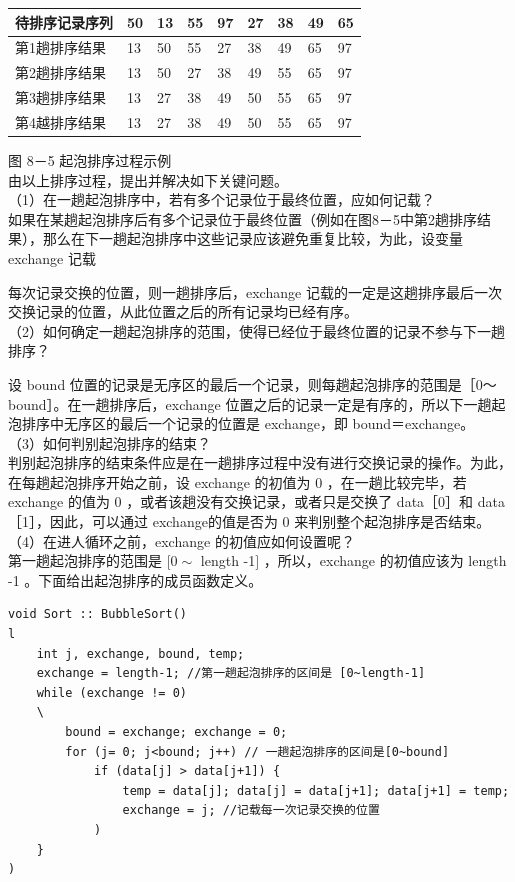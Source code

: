 \documentclass[10pt]{article}
\begin{document}
\begin{center}
\begin{tabular}{|l|l|l|l|l|l|l|l|l|}
\hline
待排序记录序列 & 50 & 13 & 55 & 97 & 27 & 38 & 49 & 65 \\
\hline
第1趟排序结果 & 13 & 50 & 55 & 27 & 38 & 49 & 65 & 97 \\
\hline
第2趟排序结果 & 13 & 50 & 27 & 38 & 49 & 55 & 65 & 97 \\
\hline
第3趟排序结果 & 13 & 27 & 38 & 49 & 50 & 55 & 65 & 97 \\
\hline
第4越排序结果 & 13 & 27 & 38 & 49 & 50 & 55 & 65 & 97 \\
\hline
\end{tabular}
\end{center}

图 8－5 起泡排序过程示例\\
由以上排序过程，提出并解决如下关键问题。\\
（1）在一趟起泡排序中，若有多个记录位于最终位置，应如何记载？\\
如果在某趟起泡排序后有多个记录位于最终位置（例如在图8－5中第2趟排序结果），那么在下一趟起泡排序中这些记录应该避免重复比较，为此，设变量 exchange 记载

每次记录交换的位置，则一趟排序后，exchange 记载的一定是这趟排序最后一次交换记录的位置，从此位置之后的所有记录均已经有序。\\
（2）如何确定一趟起泡排序的范围，使得已经位于最终位置的记录不参与下一趟排序？

设 bound 位置的记录是无序区的最后一个记录，则每趟起泡排序的范围是［0～ bound］。在一趟排序后，exchange 位置之后的记录一定是有序的，所以下一趟起泡排序中无序区的最后一个记录的位置是 exchange，即 bound＝exchange。\\
（3）如何判别起泡排序的结束？\\
判别起泡排序的结束条件应是在一趟排序过程中没有进行交换记录的操作。为此，在每趟起泡排序开始之前，设 exchange 的初值为 0 ，在一趟比较完毕，若 exchange 的值为 0 ，或者该趟没有交换记录，或者只是交换了 data［0］和 data［1］，因此，可以通过 exchange的值是否为 0 来判别整个起泡排序是否结束。\\
（4）在进人循环之前，exchange 的初值应如何设置呢？\\
第一趟起泡排序的范围是 $[0 \sim$ length -1$]$ ，所以，exchange 的初值应该为 length -1 。下面给出起泡排序的成员函数定义。

\begin{verbatim}
void Sort :: BubbleSort()
l
    int j, exchange, bound, temp;
    exchange = length-1; //第一趟起泡排序的区间是 [0~length-1]
    while (exchange != 0)
    \
        bound = exchange; exchange = 0;
        for (j= 0; j<bound; j++) // 一趟起泡排序的区间是[0~bound]
            if (data[j] > data[j+1]) {
                temp = data[j]; data[j] = data[j+1]; data[j+1] = temp;
                exchange = j; //记载每一次记录交换的位置
            )
    }
)
\end{verbatim}
\end{document}
